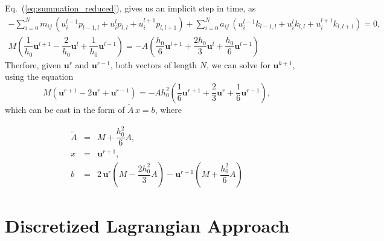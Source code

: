 \documentclass[nofootinbib,preprintnumbers,superscriptaddress,notitlepage]{revtex4-1}
\newcommand{\<}{\begin{equation}}
\newcommand{\?}{\end{equation}}
\begin{document}
Eq.~(\ref{eq:summation_reduced}), gives us an implicit step in time, as
\begin{eqnarray}
- \sum\limits_{i=0}^{N} m_{ij}\, \left(u_i^{l-1} p_{l-1, l} + u_i^{l} p_{l, l} + u_i^{l+1} p_{l, l+1} \right)
+ \sum\limits_{i=0}^{N} a_{ij}\, \left(u_i^{l-1} k_{l-1, l} + u_i^{l} k_{l, l} + u_i^{l+1} k_{l, l+1} \right) = 0, \\
M  \left( \dfrac{1}{h_0}\mathbf{u}^{l+1} -  \dfrac{2}{h_0}\mathbf{u}^{l} + \dfrac{1}{h_0}\mathbf{u}^{l-1} \right)
= - A \left( \dfrac{h_0}{6}\mathbf{u}^{l+1} +  \dfrac{2 h_0}{3}\mathbf{u}^{l} + \dfrac{h_0}{6}\mathbf{u}^{l-1} \right) 
\end{eqnarray}
Therfore, given $\mathbf{u}^r$ and $\mathbf{u}^{r-1}$, both vectors of length $N$, we can solve for $\mathbf{u}^{k+1}$, using the equation
\begin{equation}
M  \left(\mathbf{u}^{r+1} -  2\mathbf{u}^{r} + \mathbf{u}^{r-1} \right)
= - A h_0^2 \left( \dfrac{1}{6}\mathbf{u}^{r+1} +  \dfrac{2}{3}\mathbf{u}^{r} + \dfrac{1}{6}\mathbf{u}^{r-1} \right),
\end{equation}
which can be cast in the form of $\tilde{A}\, x = b$, where

\begin{eqnarray}
\tilde{A} &=& M + \dfrac{h_0^2}{6}A, \\
x &=& \mathbf{u}^{r+1}, \\
b &=& 2\,\mathbf{u}^{r}\left(M - \dfrac{2 h_0^2}{3}A\right) - \mathbf{u}^{r-1} \left(M + \dfrac{h_0^2}{6}A\right)
\end{eqnarray}

\section{Discretized Lagrangian Approach}
\end{document}
